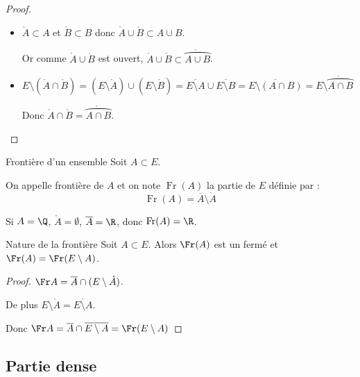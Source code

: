 \begin{proof}
\begin{itemize}
        Donc $\overline {A \cap B} \subset \overline A \cap \overline B$.

        \item $\mathring A \subset A$ et $\mathring B \subset B$ donc $\mathring A \cup \mathring B \subset A \cup B$.

        Or comme $\mathring A \cup \mathring B$ est ouvert, $\mathring A \cup \mathring B \subset \mathring{\overparen{A \cup B}}$.
        
        \item
        $E \setminus (\mathring A \cap \mathring B) = (E \setminus \mathring A) \cup (E \setminus \mathring B) = \overline{E \setminus A} \cup \overline{E \setminus B} = \overline{E \setminus (A \cap B)} = E \setminus \mathring{\overparen{A \cap B}}$

        Donc $\mathring A \cap \mathring B = \mathring{\overparen{A \cap B}}$.
    \end{itemize}
\end{proof}

\begin{definition}{Frontière d'un ensemble}{}
    Soit $A \subset E$. 

    On appelle frontière de $A$ et on note $\operatorname{Fr}(A)$ la partie de $E$ définie par :
    \[\operatorname{Fr}(A) = \overline A \setminus \mathring A\]
\end{definition}

\begin{exemple}
    Si $A = \Q$, 
    $\mathring A = \emptyset$, $\overline A = \R$, donc $\operatorname{Fr}(A) = \R$.
\end{exemple}

\begin{proposition}{Nature de la frontière}{}
    Soit $A \subset E$. Alors $\Fr(A)$ est un fermé et $\Fr(A) = \Fr(E \setminus A)$.
\end{proposition}

\begin{proof}
    $\Fr A = \overline A \cap (E \setminus \mathring A)$. 

    De plus $E \setminus \mathring A = \overline{E \setminus A}$.

    Donc $\Fr A = \overline A \cap \overline{E \setminus A} = \Fr (E \setminus A)$ 
\end{proof}

\subsection{Partie dense}


